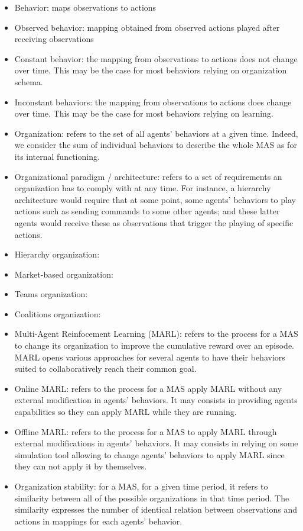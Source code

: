 \documentclass[conference]{IEEEtran}
\begin{document}
\begin{itemize}
    \item Behavior: maps observations to actions
    \item Observed behavior: mapping obtained from observed actions played after receiving observations
    \item Constant behavior: the mapping from observations to actions does not change over time. This may be the case for most behaviors relying on organization schema.
    \item Inconstant behaviors: the mapping from observations to actions does change over time. This may be the case for most behaviors relying on learning.
    \item Organization: refers to the set of all agents' behaviors at a given time. Indeed, we consider the sum of individual behaviors to describe the whole MAS as for its internal functioning.
    \item Organizational paradigm / architecture: refers to a set of requirements an organization has to comply with at any time. For instance, a hierarchy architecture would require that at some point, some agents' behaviors to play actions such as sending commands to some other agents; and these latter agents would receive these as observations that trigger the playing of specific actions.
    \item Hierarchy organization:
    \item Market-based organization:
    \item Teams organization:
    \item Coalitions organization:
    \item Multi-Agent Reinfocement Learning (MARL): refers to the process for a MAS to change its organization to improve the cumulative reward over an episode. MARL opens various approaches for several agents to have their behaviors suited to collaboratively reach their common goal.
    \item Online MARL: refers to the process for a MAS apply MARL without any external modification in agents' behaviors. It may consists in providing agents capabilities so they can apply MARL while they are running.
    \item Offline MARL: refers to the process for a MAS to apply MARL through external modifications in agents' behaviors. It may consists in relying on some simulation tool allowing to change agents' behaviors to apply MARL since they can not apply it by themselves.
    \item Organization stability: for a MAS, for a given time period, it refers to similarity between all of the possible organizations in that time period. The similarity expresses the number of identical relation between observations and actions in mappings for each agents' behavior.

\end{itemize}
\end{document}
